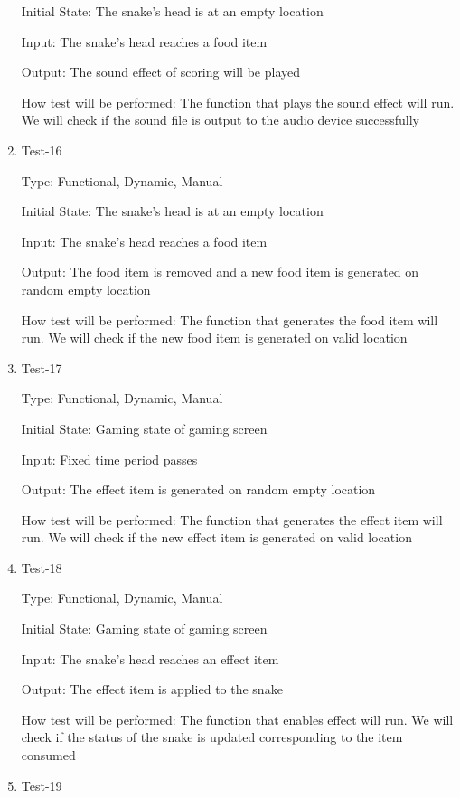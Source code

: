 \documentclass[12pt, titlepage]{article}
\begin{document}
\begin{enumerate}
Initial State: The snake's head is at an empty location

Input: The snake's head reaches a food item

Output: The sound effect of scoring will be played

How test will be performed: The function that plays the sound effect will run. We will check if the sound file is output to the audio device successfully

\item{Test-16\\}

Type: Functional, Dynamic, Manual

Initial State: The snake's head is at an empty location

Input: The snake's head reaches a food item

Output: The food item is removed and a new food item is generated on random empty location

How test will be performed: The function that generates the food item will run. We will check if the new food item is generated on valid location

\item{Test-17\\}

Type: Functional, Dynamic, Manual

Initial State: Gaming state of gaming screen

Input: Fixed time period passes

Output: The effect item is generated on random empty location

How test will be performed: The function that generates the effect item will run. We will check if the new effect item is generated on valid location

\item{Test-18\\}

Type: Functional, Dynamic, Manual

Initial State: Gaming state of gaming screen

Input: The snake's head reaches an effect item

Output: The effect item is applied to the snake

How test will be performed: The function that enables effect will run. We will check if the status of the snake is updated corresponding to the item consumed

\item{Test-19\\}


\end{enumerate}
\end{document}

